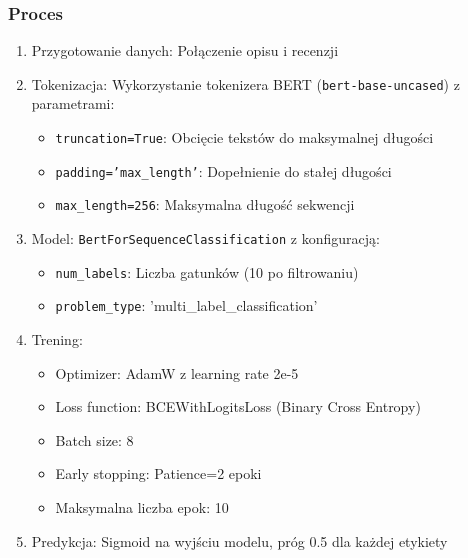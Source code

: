 \documentclass[12pt,a4paper]{article}
\begin{document}
\subsubsection{Proces}
\begin{enumerate}
    \item Przygotowanie danych: Połączenie opisu i recenzji
    \item Tokenizacja: Wykorzystanie tokenizera BERT (\texttt{bert-base-uncased}) z parametrami:
    \begin{itemize}
        \item \texttt{truncation=True}: Obcięcie tekstów do maksymalnej długości
        \item \texttt{padding='max\_length'}: Dopełnienie do stałej długości
        \item \texttt{max\_length=256}: Maksymalna długość sekwencji
    \end{itemize}
    \item Model: \texttt{BertForSequenceClassification} z konfiguracją:
    \begin{itemize}
        \item \texttt{num\_labels}: Liczba gatunków (10 po filtrowaniu)
        \item \texttt{problem\_type}: 'multi\_label\_classification'
    \end{itemize}
    \item Trening:
    \begin{itemize}
        \item Optimizer: AdamW z learning rate 2e-5
        \item Loss function: BCEWithLogitsLoss (Binary Cross Entropy)
        \item Batch size: 8
        \item Early stopping: Patience=2 epoki
        \item Maksymalna liczba epok: 10
    \end{itemize}
    \item Predykcja: Sigmoid na wyjściu modelu, próg 0.5 dla każdej etykiety
\end{enumerate}
\end{document}
